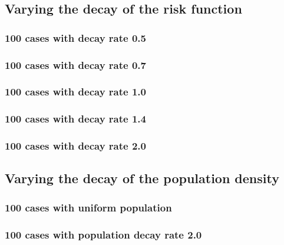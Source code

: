 \subsection{Varying the decay of the risk function}

\subsubsection{100 cases with decay rate 0.5}


\subsubsection{100 cases with decay rate 0.7}


\subsubsection{100 cases with decay rate 1.0}


\subsubsection{100 cases with decay rate 1.4}


\subsubsection{100 cases with decay rate 2.0}


\subsection{Varying the decay of the population density}

\subsubsection{100 cases with uniform population}


\subsubsection{100 cases with population decay rate 2.0}


